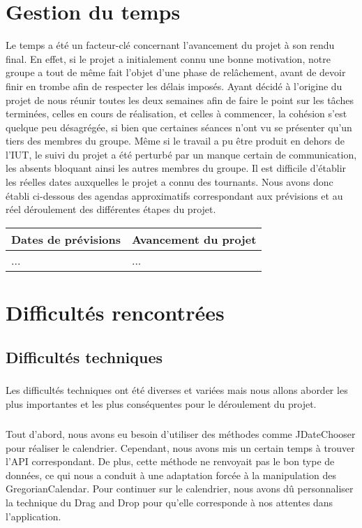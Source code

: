 \documentclass[a4paper,10pt]{report}
\begin{document}
  \chapter{Gestion du temps}
    Le temps a été un facteur-clé concernant l'avancement du projet à son rendu final.
    En effet, si le projet a initialement connu une bonne motivation, notre groupe a tout de même fait l'objet d'une phase de relâchement, avant de devoir finir en trombe afin de respecter les délais imposés.
    Ayant décidé à l'origine du projet de nous réunir toutes les deux semaines afin de faire le point sur les tâches terminées, celles en cours de réalisation, et celles à commencer, la cohésion s'est quelque peu désagrégée, si bien que certaines séances n'ont vu se présenter qu'un tiers des membres du groupe.
    Même si le travail a pu être produit en dehors de l'IUT, le suivi du projet a été perturbé par un manque certain de communication, les absents bloquant ainsi les autres membres du groupe.
    Il est difficile d'établir les réelles dates auxquelles le projet a connu des tournants.
    Nous avons donc établi ci-dessous des agendas approximatifs correspondant aux prévisions et au réel déroulement des différentes étapes du projet.
    
    
    \begin{tabular}{|l|l|}
      \hline
	Dates de prévisions & Avancement du projet\\
      \hline
	... & ...\\
      \hline
    \end{tabular}

    

    
    
  \chapter{Difficultés rencontrées}
    \section{Difficultés techniques}
      \paragraph{}
	Les difficultés techniques ont été diverses et variées mais nous allons aborder les plus importantes et les plus conséquentes pour le déroulement du projet.
      
      \paragraph{}
	Tout d'abord, nous avons eu besoin d'utiliser des méthodes comme JDateChooser pour réaliser le calendrier. Cependant, nous avons mis un certain temps à trouver l'API correspondant.
	De plus, cette méthode ne renvoyait pas le bon type de données, ce qui nous a conduit à une adaptation forcée à la manipulation des GregorianCalendar.
	Pour continuer sur le calendrier, nous avons dû personnaliser la technique du Drag and Drop pour qu'elle corresponde à nos attentes dans l'application.
	
\end{document}
